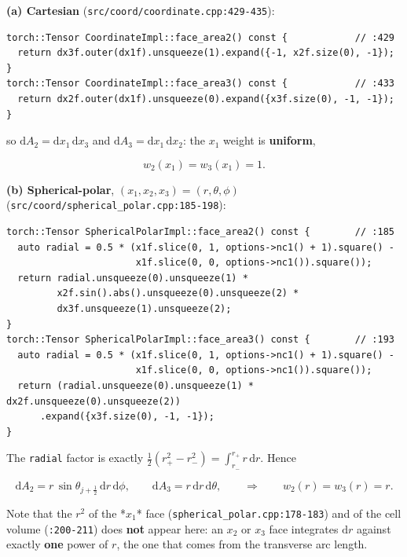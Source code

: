\documentclass[11pt,a4paper]{article}
\begin{document}
\textbf{(a) Cartesian} (\texttt{src/coord/coordinate.cpp:429-435}):

\begin{lstlisting}
torch::Tensor CoordinateImpl::face_area2() const {            // :429
  return dx3f.outer(dx1f).unsqueeze(1).expand({-1, x2f.size(0), -1});
}
torch::Tensor CoordinateImpl::face_area3() const {            // :433
  return dx2f.outer(dx1f).unsqueeze(0).expand({x3f.size(0), -1, -1});
}
\end{lstlisting}

so $\mathrm{d}A_2 = \mathrm{d}x_1\,\mathrm{d}x_3$ and
$\mathrm{d}A_3=\mathrm{d}x_1\,\mathrm{d}x_2$: the $x_1$ weight is \textbf{uniform},

\begin{equation*}
w_2(x_1)=w_3(x_1)=1 .
\tag{1.5}
\end{equation*}

\textbf{(b) Spherical-polar}, $(x_1,x_2,x_3)=(r,\theta,\phi)$
(\texttt{src/coord/spherical\_polar.cpp:185-198}):

\begin{lstlisting}
torch::Tensor SphericalPolarImpl::face_area2() const {        // :185
  auto radial = 0.5 * (x1f.slice(0, 1, options->nc1() + 1).square() -
                       x1f.slice(0, 0, options->nc1()).square());
  return radial.unsqueeze(0).unsqueeze(1) *
         x2f.sin().abs().unsqueeze(0).unsqueeze(2) *
         dx3f.unsqueeze(1).unsqueeze(2);
}
torch::Tensor SphericalPolarImpl::face_area3() const {        // :193
  auto radial = 0.5 * (x1f.slice(0, 1, options->nc1() + 1).square() -
                       x1f.slice(0, 0, options->nc1()).square());
  return (radial.unsqueeze(0).unsqueeze(1) * dx2f.unsqueeze(0).unsqueeze(2))
      .expand({x3f.size(0), -1, -1});
}
\end{lstlisting}

The \texttt{radial} factor is exactly $\tfrac12(r_+^2-r_-^2)=\int_{r_-}^{r_+} r\,\mathrm{d}r$.
Hence

\begin{equation*}
\mathrm{d}A_2 = r\,\sin\theta_{j+\frac12}\,\mathrm{d}r\,\mathrm{d}\phi,
\qquad
\mathrm{d}A_3 = r\,\mathrm{d}r\,\mathrm{d}\theta,
\qquad\Longrightarrow\qquad
w_2(r)=w_3(r)=r .
\tag{1.6}
\end{equation*}

Note that the $r^2$ of the *$x_1$* face (\texttt{spherical\_polar.cpp:178-183}) and of
the cell volume (\texttt{:200-211}) does \textbf{not} appear here: an $x_2$ or $x_3$ face
integrates $\mathrm{d}r$ against exactly \textbf{one} power of $r$, the one that comes
from the transverse arc length.
\end{document}
